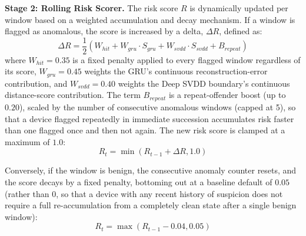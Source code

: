 \textbf{Stage 2: Rolling Risk Scorer.} The risk score $R$ is dynamically updated per window based on a weighted accumulation and decay mechanism. If a window is flagged as anomalous, the score is increased by a delta, $\Delta R$, defined as:
\begin{equation}
\Delta R = \frac{1}{2} \left( W_{hit} + W_{gru} \cdot S_{gru} + W_{svdd} \cdot S_{svdd} + B_{repeat} \right)
\label{e:delta_r}
\end{equation}
where $W_{hit} = 0.35$ is a fixed penalty applied to every flagged window regardless of its score, $W_{gru} = 0.45$ weights the GRU's continuous reconstruction-error contribution, and $W_{svdd} = 0.40$ weights the Deep SVDD boundary's continuous distance-score contribution. The term $B_{repeat}$ is a repeat-offender boost (up to $0.20$), scaled by the number of consecutive anomalous windows (capped at 5), so that a device flagged repeatedly in immediate succession accumulates risk faster than one flagged once and then not again. The new risk score is clamped at a maximum of $1.0$:
\begin{equation}
R_{t} = \min(R_{t-1} + \Delta R, 1.0)
\label{e:risk_increase}
\end{equation}

Conversely, if the window is benign, the consecutive anomaly counter resets, and the score decays by a fixed penalty, bottoming out at a baseline default of $0.05$ (rather than $0$, so that a device with any recent history of suspicion does not require a full re-accumulation from a completely clean state after a single benign window):
\begin{equation}
R_{t} = \max(R_{t-1} - 0.04, 0.05)
\label{e:risk_decay}
\end{equation}

